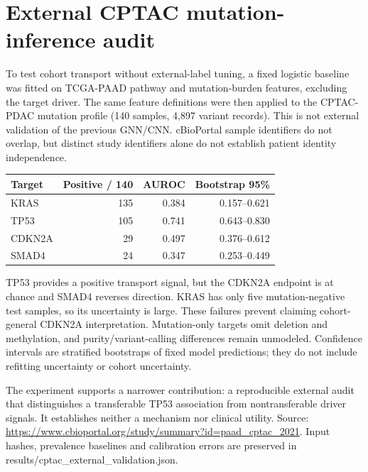 \section{External CPTAC mutation-inference audit}

To test cohort transport without external-label tuning, a fixed logistic baseline was fitted on TCGA-PAAD pathway and mutation-burden features, excluding the target driver. The same feature definitions were then applied to the CPTAC-PDAC mutation profile (140 samples, 4,897 variant records). This is not external validation of the previous GNN/CNN. cBioPortal sample identifiers do not overlap, but distinct study identifiers alone do not establish patient identity independence.

\begin{center}\begin{tabular}{lrrr}\hline Target & Positive / 140 & AUROC & Bootstrap 95\%\\\hline

KRAS & 135 & 0.384 & 0.157--0.621 \\

TP53 & 105 & 0.741 & 0.643--0.830 \\

CDKN2A & 29 & 0.497 & 0.376--0.612 \\

SMAD4 & 24 & 0.347 & 0.253--0.449 \\

\hline\end{tabular}\end{center}

TP53 provides a positive transport signal, but the CDKN2A endpoint is at chance and SMAD4 reverses direction. KRAS has only five mutation-negative test samples, so its uncertainty is large. These failures prevent claiming cohort-general CDKN2A interpretation. Mutation-only targets omit deletion and methylation, and purity/variant-calling differences remain unmodeled. Confidence intervals are stratified bootstraps of fixed model predictions; they do not include refitting uncertainty or cohort uncertainty.

The experiment supports a narrower contribution: a reproducible external audit that distinguishes a transferable TP53 association from nontransferable driver signals. It establishes neither a mechanism nor clinical utility. Source: \url{https://www.cbioportal.org/study/summary?id=paad_cptac_2021}. Input hashes, prevalence baselines and calibration errors are preserved in results/cptac\_external\_validation.json.

